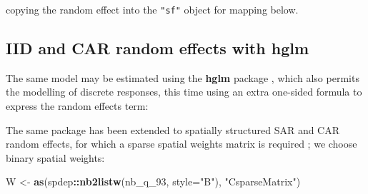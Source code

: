 \documentclass[]{book}
\newenvironment{Shaded}{\begin{snugshade}}{\end{snugshade}}
\newcommand{\DataTypeTok}[1]{\textcolor[rgb]{0.13,0.29,0.53}{#1}}
\newcommand{\DecValTok}[1]{\textcolor[rgb]{0.00,0.00,0.81}{#1}}
\newcommand{\KeywordTok}[1]{\textcolor[rgb]{0.13,0.29,0.53}{\textbf{#1}}}
\newcommand{\NormalTok}[1]{#1}
\newcommand{\OperatorTok}[1]{\textcolor[rgb]{0.81,0.36,0.00}{\textbf{#1}}}
\newcommand{\StringTok}[1]{\textcolor[rgb]{0.31,0.60,0.02}{#1}}
\begin{document}
copying the random effect into the \texttt{"sf"} object for mapping below.

\begin{Shaded}
\end{Shaded}

\hypertarget{iid-and-car-random-effects-with-hglm}{%
\subsection{IID and CAR random effects with hglm}\label{iid-and-car-random-effects-with-hglm}}

The same model may be estimated using the \textbf{hglm} package \citep{R-hglm}, which also permits the modelling of discrete responses, this time using an extra one-sided formula to express the random effects term:

\begin{Shaded}
\end{Shaded}

The same package has been extended to spatially structured SAR and CAR random effects, for which a sparse spatial weights matrix is required \citep{alam-ronnegard-shen:2015}; we choose binary spatial weights:

\begin{Shaded}
\begin{Highlighting}[]
\NormalTok{W <-}\StringTok{ }\KeywordTok{as}\NormalTok{(spdep}\OperatorTok{::}\KeywordTok{nb2listw}\NormalTok{(nb_q_}\DecValTok{93}\NormalTok{, }\DataTypeTok{style=}\StringTok{"B"}\NormalTok{), }\StringTok{"CsparseMatrix"}\NormalTok{)}
\end{Highlighting}
\end{Shaded}
\end{document}
